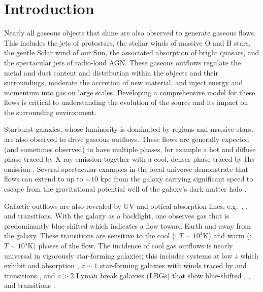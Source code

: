 \documentclass[]{emulateapj}
\begin{document}

\section{Introduction}
\label{sec:intro}

Nearly all gaseous objects that shine are also
observed to generate gaseous flows.  This includes the jets of protostars, the
stellar winds of massive O and B stars, the gentle Solar wind
of our Sun, the associated absorption of bright quasars, and the
spectacular jets of radio-loud AGN.   These gaseous outflows 
regulate the metal and dust content and distribution within the 
objects and their surroundings, 
moderate the accretion of new material, and %
inject energy and momentum into gas on large scales. %
Developing a comprehensive model for these flows is critical to
understanding the evolution of the source and its impact on the
surrounding environment.

Starburst galaxies, whose luminosity is dominated by  regions
and massive stars, are also observed to drive gaseous outflows.  These
flows are generally expected (and sometimes observed) to have multiple
phases, for example a hot and diffuse phase traced by X-ray emission
together with a cool, denser phase traced by H$\alpha$ emission 
\citep[e.g.][]{ham90,martin99,shc+04,km10}. 
Several spectacular
examples in the local universe demonstrate that flows can extend to
up to $\sim 10$ kpc
from the galaxy \citep{lhw99,vsr+03,wsg08} carrying significant speed
to escape from the gravitational potential well of the galaxy's dark
matter halo \citep[e.g.][]{sh09}.

Galactic outflows are also
revealed by UV and optical absorption lines, e.g.\ ,
,  and  transitions.  With the galaxy
as a backlight, one observes gas that is predominantly
blue-shifted which indicates a flow toward
Earth and away from the galaxy.  These transitions are sensitive to
the cool (; $T \sim 10^4$K) and warm (; $T \sim
10^5$K) phases of the flow.  
The incidence of cool gas outflows is
nearly universal in vigorously
star-forming galaxies;  this includes systems at low $z$
which exhibit  and  absorption
\citep{rvs05a,martin05,smn+09,mb09,cth+10}, 
$z \sim 1$ star-forming galaxies with winds traced by
 and  transitions \citep{wcp+09,rwk+10}, and
$z>2$ Lyman break galaxies (LBGs) that show blue-shifted ,
, and  transitions \citep{sgp+96,lkg+97,shapley03}.
\end{document}
